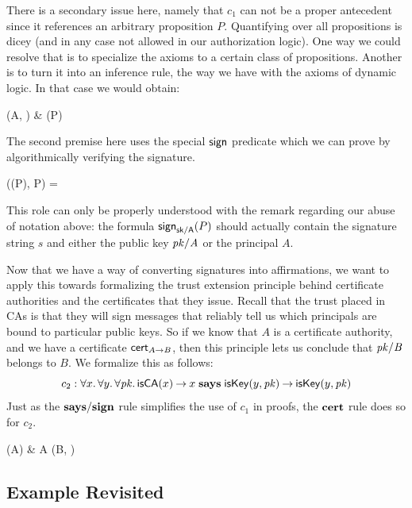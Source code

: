 \documentclass[11pt]{article}
\begin{document}
There is a secondary issue here, namely that $c_1$ can not be a proper
antecedent since it references an arbitrary proposition $P$.  Quantifying
over all propositions is dicey (and in any case not allowed in our authorization
logic).  One way we could resolve that is to specialize the axioms to
a certain class of propositions.  Another is to turn it into an inference
rule, the way we have with the axioms of dynamic logic.  In that case we
would obtain:
\begin{rules}
  {\Gamma \vdash {}(A, )
    & \Gamma \vdash {}(P)}
\end{rules}
The second premise here uses the special $\mathsf{sign}$ predicate which we
can prove by algorithmically verifying the signature.
\begin{rules}
  {((P), P) = }
\end{rules}
This role can only be properly understood with the remark regarding our abuse of
notation above: the formula $\mathsf{sign}_{\mathsf{sk/A}}(P)$ should actually contain the
signature string $s$ and either the public key $\mathit{pk/A}$ or the principal $A$.

Now that we have a way of converting signatures into affirmations, we
want to apply this towards formalizing the trust extension principle
behind certificate authorities and the certificates that they issue.
Recall that the trust placed in CAs is that they will sign messages
that reliably tell us which principals are bound to particular public
keys. So if we know that $A$ is a certificate authority, and we have a
certificate $\mathsf{cert}_{{A} \mathbin{\rightarrow} {B}}$, then this principle lets us conclude that
$\mathit{pk/B}$ belongs to $B$. We formalize this as follows:
\[
  c_2 : \forall x.\, \forall y.\, \forall \mathit{pk}.\,
  \mathsf{isCA}(x) \mathbin{\rightarrow} x \mathrel{\mathbf{says}} \mathsf{isKey}(y, \mathit{pk}) \mathbin{\rightarrow} \mathsf{isKey}(y, \mathit{pk})
\]
Just as the $\mathbf{says}/\mathbf{sign}$ rule simplifies the use of $c_1$ in proofs,
the $\mathbf{cert}$ rule does so for $c_2$.
\begin{rules}
  {\Gamma \vdash {}(A)
    & \Gamma \vdash A \says {}(B, )}
\end{rules}

\subsection{Example Revisited}
\end{document}
